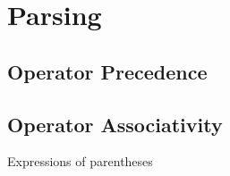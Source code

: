 
\section{Parsing}
\subsection{Operator Precedence}


\subsection{Operator Associativity}

\csharpsubsection{\csharp}

\begin{syntaxfloat}
  
  \caption{Expressions of parentheses}
  \label{syntax:prim:pars}
\end{syntaxfloat}


